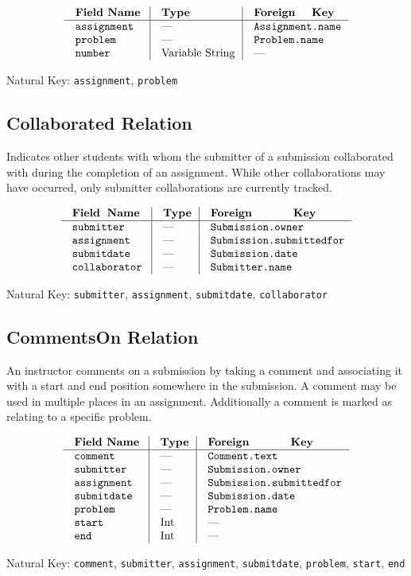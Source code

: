 $$\vbox{
	\offinterlineskip
	\halign{
		\strut \quad {\tt #}	& \vrule\quad #	& \vrule\quad # \cr
		{\bf Field Name}	& {\bf Type}	& {\bf Foreign Key}\cr
		\noalign{\hrule}		
		assignment	& ---	& {\tt Assignment.name} \cr
		problem	& ---	& {\tt Problem.name} \cr
		number	& Variable String	& --- \cr
	}
}$$

{\noindent
Natural Key: {\tt assignment}, {\tt problem}\par}

\subsection{Collaborated Relation}
Indicates other students with whom the submitter of a submission
collaborated with during the completion of an assignment.
While other collaborations may have occurred, only submitter 
collaborations are currently tracked.

$$\vbox{
	\offinterlineskip
	\halign{
		\strut \quad {\tt #}	& \vrule\quad #	& \vrule\quad # \cr
		{\bf Field Name}	& {\bf Type}	& {\bf Foreign Key}\cr
		\noalign{\hrule}		
		submitter	& ---	& {\tt Submission.owner} \cr
		assignment	& ---	& {\tt Submission.submittedfor} \cr
		submitdate	& ---	& {\tt Submission.date} \cr
		collaborator	& ---	& {\tt Submitter.name} \cr
	}
}$$

{\noindent
Natural Key: {\tt submitter}, {\tt assignment}, {\tt submitdate}, {\tt collaborator}\par}

\subsection{CommentsOn Relation}
An instructor comments on a submission by taking a comment 
and associating it with a start and end position somewhere in the submission. 
A comment may be used in multiple places in an assignment. 
Additionally a comment is marked as relating to a specific problem.

$$\vbox{
	\offinterlineskip
	\halign{
		\strut \quad {\tt #}	& \vrule\quad #	& \vrule\quad # \cr
		{\bf Field Name}	& {\bf Type}	& {\bf Foreign Key}\cr
		\noalign{\hrule}		
		comment	& ---	& {\tt Comment.text} \cr
		submitter	& ---	& {\tt Submission.owner} \cr
		assignment	& ---	& {\tt Submission.submittedfor} \cr
		submitdate	& ---	& {\tt Submission.date} \cr
		problem	& ---	& {\tt Problem.name} \cr
		start	& Int	& --- \cr
		end	& Int	& --- \cr
	}
}$$

{\noindent
Natural Key: {\tt comment}, {\tt submitter}, {\tt assignment},
{\tt submitdate}, {\tt problem}, {\tt start}, {\tt end}\par}

